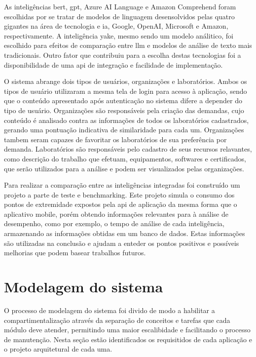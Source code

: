 As inteligências \gls{bert}, \gls{gpt}, Azure AI Language e Amazon Comprehend foram escolhidas por se tratar de modelos de linguagem desensolvidos pelas quatro gigantes na área de tecnologia e \gls{ia}, Google, OpenAI, Microsoft e Amazon, respectivamente. A inteligência \gls{yake}, mesmo sendo um modelo análitico, foi escolhido para efeitos de comparação entre \gls{llm} e modelos de análise de texto mais tradicionais. Outro fator que contribuiu para a escolha destas tecnologias foi a disponibilidade de uma \gls{api} de integração e facilidade de implementação.

O sistema abrange dois tipos de usuários, organizações e laboratórios. Ambos os tipos de usuário utilizaram a mesma tela de login para acesso à aplicação, sendo que o conteúdo apresentado após autenticação no sistema difere a depender do tipo de usuário. Organizações são responsáveis pela criação das demandas, cujo conteúdo é analisado contra as informações de todos os laboratórios cadastrados, gerando uma pontuação indicativa de similaridade para cada um. Organizações tambem seram capazes de favoritar os laboratórios de sua preferência por demanda. Laboratórios são responsáveis pelo cadastro de seus recursos relavantes, como descrição do trabalho que efetuam, equipamentos, softwares e certificados, que serão utilizados para a análise e podem ser visualizados pelas organizações.

Para realizar a comparação entre as inteligências integradas foi construído um projeto a parte de teste e benchmarking. Este projeto simula o consumo dos pontos de extremidade expostos pela \gls{api} de aplicação da mesma forma que o aplicativo mobile, porém obtendo informações relevantes para à análise de desempenho, como por exemplo, o tempo de análise de cada inteligência, armazenando as informações obtidas em um banco de dados. Estas informações são utilizadas na conclusão e ajudam a enteder os pontos positivos e possíveis melhorias que podem basear trabalhos futuros.


\section{Modelagem do sistema}\label{sec:modelagem}

O processo de modelagem do sistema foi divido de modo a habilitar a compartimentalização através da separação de conceitos e tarefas que cada módulo deve atender, permitindo uma maior escalibidade e facilitando o processo de manutenção. Nesta seção estão identificados os requisitidos de cada aplicação e o projeto arquitetural de cada uma.

